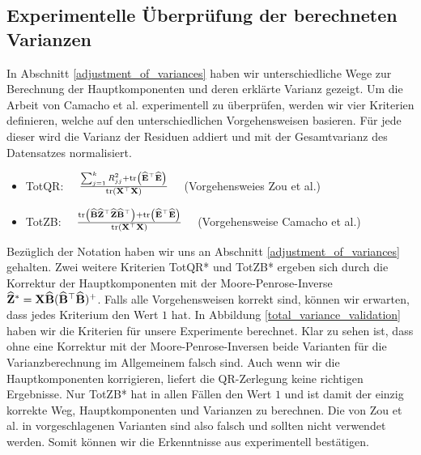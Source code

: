 

\subsection{Experimentelle Überprüfung der berechneten Varianzen}

In Abschnitt \ref{adjustment_of_variances} haben wir unterschiedliche Wege zur Berechnung der Hauptkomponenten und deren erklärte Varianz gezeigt. Um die Arbeit von Camacho et al. \cite{camacho} experimentell zu überprüfen, werden wir vier Kriterien definieren, welche auf den unterschiedlichen Vorgehensweisen basieren. Für jede dieser wird die Varianz der Residuen addiert und mit der Gesamtvarianz des Datensatzes normalisiert.
\begin{itemize}
\item TotQR: $\quad \frac{\sum_{j=1}^k R_{jj}^2 + \text{tr} \left( \widehat{\mathbf{E}}^{\top}\widehat{\mathbf{E}} \right)}{\text{tr} \left( \mathbf{X}^{\top}\mathbf{X} \right)} \quad$ (Vorgehensweies Zou et al.)
\item TotZB: $\quad \frac{\text{tr} \left( \widehat{\mathbf{B}} \widehat{\mathbf{Z}}^{\top} \widehat{\mathbf{Z}} \widehat{\mathbf{B}}^{\top} \right) + \text{tr} \left( \widehat{\mathbf{E}}^{\top}\widehat{\mathbf{E}} \right)}{\text{tr} \left( \mathbf{X}^{\top}\mathbf{X} \right)} \quad$ (Vorgehensweise Camacho et al.)
\end{itemize}
Bezüglich der Notation haben wir uns an Abschnitt \ref{adjustment_of_variances} gehalten. Zwei weitere Kriterien TotQR* und TotZB* ergeben sich durch die Korrektur der Hauptkomponenten mit der Moore-Penrose-Inverse $\widehat{\mathbf{Z}}^* = \mathbf{X} \widehat{\mathbf{B}} (\widehat{\mathbf{B}}^{\top}\widehat{\mathbf{B}})^+$. Falls alle Vorgehensweisen korrekt sind, können wir erwarten, dass jedes Kriterium den Wert $1$ hat. In Abbildung \ref{total_variance_validation} haben wir die Kriterien für unsere Experimente berechnet. Klar zu sehen ist, dass ohne eine Korrektur mit der Moore-Penrose-Inversen beide Varianten für die Varianzberechnung im Allgemeinem falsch sind. Auch wenn wir die Hauptkomponenten korrigieren, liefert die QR-Zerlegung keine richtigen Ergebnisse. Nur TotZB* hat in allen Fällen den Wert $1$ und ist damit der einzig korrekte Weg, Hauptkomponenten und Varianzen zu berechnen. Die von Zou et al. in \cite{zou_sparsepca} vorgeschlagenen Varianten sind also falsch und sollten nicht verwendet werden. Somit können wir die Erkenntnisse aus \cite{camacho} experimentell bestätigen.

